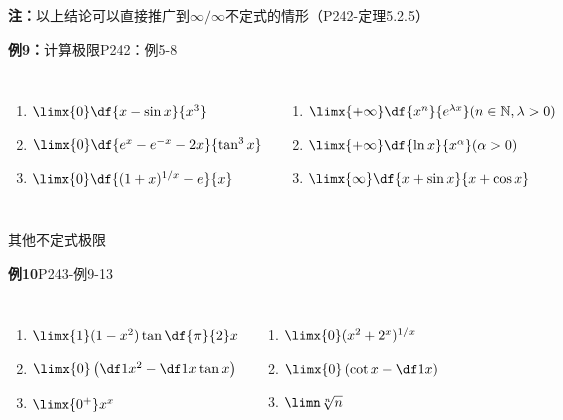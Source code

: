 \begin{frame}
	\linespread{1.5}
	{\bf 注：}以上结论可以直接推广到$\infty/\infty$不定式的情形\pause （{\bb P242-定理5.2.5}）\pause 
	\bigskip
	\begin{exampleblock}{{\bf 例9：}计算极限\hfill P242：例5-8}
		\begin{columns}\pause 
				\begin{enumerate}
				  \item $\limx{0}\df{x-\sin x}{x^3}$\pause 
				  \item $\limx{0}\df{e^x-e^{-x}-2x}{\tan^3x}$\pause 
				  \item $\limx{0}\df{(1+x)^{1/x}-e}{x}$\pause 
				\end{enumerate}
				\begin{enumerate}
				  \addtocounter{enumi}{3}
				  \item $\limx{+\infty}\df{x^n}{e^{\lambda
				  x}}(n\in\mathbb{N},\lambda>0)$\pause 
				  \item $\limx{+\infty}\df{\ln x}{x^\alpha}(\alpha>0)$\pause 
				  \item $\limx{\infty}\df{x+\sin x}{x+\cos x}$
				\end{enumerate}
		\end{columns}
	\end{exampleblock}
\end{frame}

\begin{frame}{其他不定式极限}
	\linespread{2}
	\begin{exampleblock}{{\bf 例10}\hfill P243-例9-13}\pause 
		\begin{columns}\pause 
				\begin{enumerate}
				  \item $\limx{1}(1-x^2)\tan\df{\pi}{2}x$\pause 
				  \item $\limx{0}\left(\df 1{x^2}-\df 1{x\tan x}\right)$\pause 
				  \item $\limx{0^+}x^x$\pause 
				\end{enumerate}
				\begin{enumerate}
				  \addtocounter{enumi}{3}
				  \item $\limx{0}(x^2+2^x)^{1/x}$\pause 
				  \item $\limx{0}\left(\cot x-\df 1x\right)$\pause 
				  \item $\limn\sqrt[n]n$
				\end{enumerate}
		\end{columns}
	\end{exampleblock}
\end{frame}

